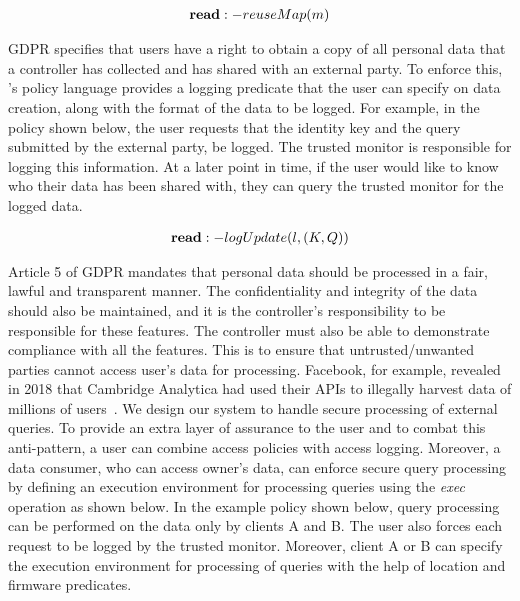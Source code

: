 \vspace{-2mm}
\[
 \begin{array}{@{}l@{}}
 \textbf{read}:-reuseMap(m)
 \end{array}
\]
\vspace{-4mm}

GDPR specifies that users have a right to obtain a copy of all personal data that a controller has collected and has shared with an external party. To enforce this, \project{}'s policy language provides a logging predicate that the user can specify on data creation, along with the format of the data to be logged. For example, in the policy shown below, the user requests that the identity key and the query submitted by the external party, be logged. The trusted monitor is responsible for logging this information. At a later point in time, if the user would like to know who their data has been shared with, they can query the trusted monitor for the logged data.

\vspace{-2mm}
\[
 \begin{array}{@{}l@{}}
 \textbf{read}:-logUpdate(l, (K, Q))
 \end{array}
\]
\vspace{-2mm}

Article 5 of GDPR mandates that personal data should be processed in a fair, lawful and transparent manner. The confidentiality and integrity of the data should also be maintained, and it is the controller's responsibility to be responsible for these features. The controller must also be able to demonstrate compliance with all the features. This is to ensure that untrusted/unwanted parties cannot access user's data for processing. Facebook, for example, revealed in 2018 that Cambridge Analytica had used their APIs to illegally harvest data of millions of users~\cite{cambridge-analytica-breach, facebook-viewas-breach}.
We design our system  to handle secure processing of external queries. To provide an extra layer of assurance to the user and to combat this anti-pattern, a user can combine access policies with access logging. Moreover, a data consumer, who can access owner's data, can enforce secure query processing by defining an execution environment for processing queries using the \emph{exec} operation as shown below. In the example policy shown below, query processing can be performed on the data only by clients A and B. The user also forces each request to be logged by the trusted monitor. Moreover, client A or B can specify the execution environment for processing of queries with the help of location and firmware predicates.

